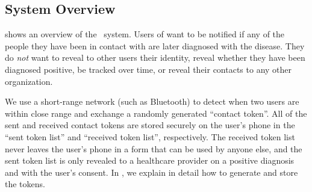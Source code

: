 

\subsection{System Overview}
\label{subs:system_overview}


 shows an overview of the \dect\ system. Users of \dect want to be notified if any of the people they have been in contact with are later diagnosed with the disease. They do \textit{not} want to reveal to other users their identity, reveal whether they have been diagnosed positive, be tracked over time, or reveal their contacts to any other organization.

We use a short-range network (such as Bluetooth) to detect when two users are within close range and exchange a randomly generated ``contact token''. All of the sent and received contact tokens are stored securely on the user's phone in the ``sent token list'' and ``received token list'', respectively. The received token list never leaves the user's phone in a form that can be used by anyone else, and the sent token list is only revealed to a healthcare provider on a positive diagnosis and with the user's consent. In , we explain in detail how to generate and store the tokens.


